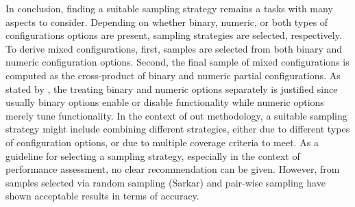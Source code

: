 In conclusion, finding a suitable sampling strategy remains a tasks with many
aspects to consider. Depending on whether binary, numeric, or both types of
configurations options are present, sampling strategies are selected,
respectively. To derive mixed configurations, first, samples are selected from
both binary and numeric configuration options. Second, the final sample of
mixed configurations is computed as the cross-product of binary and numeric
partial configurations. As stated by \cite{siegmund_predicting_2012}, the
treating binary and numeric options separately is justified since usually binary options enable
or disable functionality while numeric options merely tune functionality. In
the context of out methodology, a suitable sampling strategy might include
combining different strategies, either due to different types of configuration
options, or due to multiple coverage criteria to meet. As a guideline for
selecting a sampling strategy, especially in the context of performance
assessment, no clear recommendation can be given. However, from samples
selected via random sampling (Sarkar) and pair-wise sampling
\cite{sarkar_cost-efficient_2015} have shown acceptable results in terms of accuracy.
